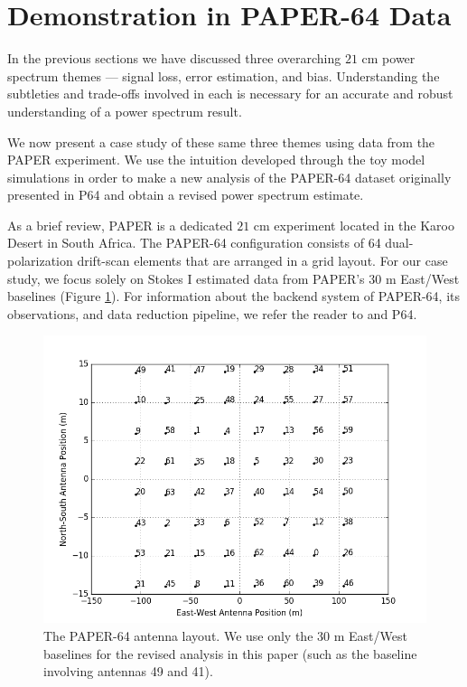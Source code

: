 \documentclass[preprint2,numberedappendix,tighten]{aastex6}  %
\begin{document}

\section{Demonstration in PAPER-64 Data}
\label{sec:CaseStudy}

In the previous sections we have discussed three overarching $21$ cm power spectrum themes --- signal loss, error estimation, 
and bias. Understanding the subtleties and trade-offs involved in each is necessary for an accurate and robust understanding of 
a power spectrum result. 

We now present a case study of these same three themes using data from the PAPER experiment. We use the intuition 
developed through the toy model simulations in order to make a new analysis of the PAPER-64 dataset originally presented in 
P64 and obtain a revised power spectrum estimate.

As a brief review, PAPER is a dedicated $21$ cm experiment located in the Karoo Desert in South Africa. The PAPER-64 
configuration consists of 64 dual-polarization drift-scan elements that are arranged in a grid layout. For our case study, we 
focus solely on Stokes I estimated data \citep{moore_et_al2013} from PAPER's $30$ m East/West baselines (Figure 
\ref{fig:ant_layout}). For information about the backend system of PAPER-64, its observations, and data reduction pipeline, we 
refer the reader to \citet{parsons_et_al2010} and P64.

\begin{figure}
	\centering
	\includegraphics[width=\columnwidth]{plots/ant_layout.png}
	\caption{The PAPER-64 antenna layout. We use only the $30$ m East/West baselines for the revised analysis in this 
paper (such as the baseline involving antennas 49 and 41).}
	\label{fig:ant_layout}
\end{figure}
\end{document}
